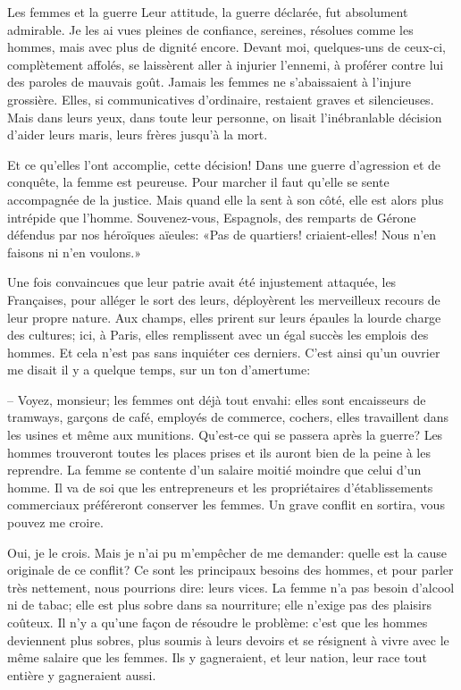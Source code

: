 \begin{chapter}{Les femmes et la guerre}
Leur attitude, la guerre déclarée, fut absolument admirable. Je les ai
vues pleines de confiance, sereines, résolues comme les hommes, mais
avec plus de dignité encore. Devant moi, quelques-uns de ceux-ci,
complètement affolés, se laissèrent aller à injurier l'ennemi, à
proférer contre lui des paroles de mauvais goût. Jamais les femmes ne
s'abaissaient à l'injure grossière. Elles, si communicatives
d'ordinaire, restaient graves et silencieuses. Mais dans leurs yeux,
dans toute leur personne, on lisait l'inébranlable décision d'aider
leurs maris, leurs frères jusqu'à la mort.

Et ce qu'elles l'ont accomplie, cette décision! Dans une guerre
d'agression et de conquête, la femme est peureuse. Pour marcher il faut
qu'elle se sente accompagnée de la justice. Mais quand elle la sent à
son côté, elle est alors plus intrépide que l'homme. Souvenez-vous,
Espagnols, des remparts de Gérone défendus par nos héroïques aïeules:
«Pas de quartiers! criaient-elles! Nous n'en faisons ni n'en voulons.»

Une fois convaincues que leur patrie avait été injustement attaquée, les
Françaises, pour alléger le sort des leurs, déployèrent les merveilleux
recours de leur propre nature. Aux champs, elles prirent sur leurs
épaules la lourde charge des cultures; ici, à Paris, elles remplissent
avec un égal succès les emplois des hommes. Et cela n'est pas sans
inquiéter ces derniers. C'est ainsi qu'un ouvrier me disait il y a
quelque temps, sur un ton d'amertume:

-- Voyez, monsieur; les femmes ont déjà tout envahi: elles sont
encaisseurs de tramways, garçons de café, employés de commerce, cochers,
elles travaillent dans les usines et même aux munitions. Qu'est-ce qui
se passera après la guerre? Les hommes trouveront toutes les places
prises et ils auront bien de la peine à les reprendre. La femme se
contente d'un salaire moitié moindre que celui d'un homme. Il va de soi
que les entrepreneurs et les propriétaires d'établissements commerciaux
préféreront conserver les femmes. Un grave conflit en sortira, vous
pouvez me croire.

Oui, je le crois. Mais je n'ai pu m'empêcher de me demander: quelle est
la cause originale de ce conflit? Ce sont les principaux besoins des
hommes, et pour parler très nettement, nous pourrions dire: leurs vices.
La femme n'a pas besoin d'alcool ni de tabac; elle est plus sobre dans
sa nourriture; elle n'exige pas des plaisirs coûteux. Il n'y a qu'une
façon de résoudre le problème: c'est que les hommes deviennent plus
sobres, plus soumis à leurs devoirs et se résignent à vivre avec le même
salaire que les femmes. Ils y gagneraient, et leur nation, leur race
tout entière y gagneraient aussi.


\end{chapter}

